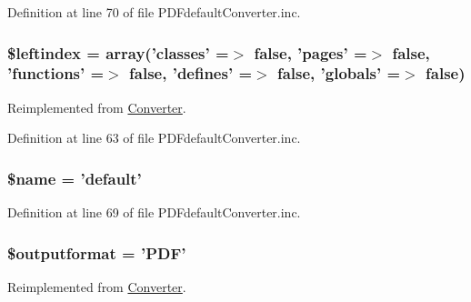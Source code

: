 \-Definition at line 70 of file \-P\-D\-Fdefault\-Converter.\-inc.

\hypertarget{class_p_d_fdefault_converter_ab49669c749559bb7833762878adb8f0c}{
\subsubsection[{\$leftindex}]{\setlength{\rightskip}{0pt plus 5cm}\$leftindex = array('classes' =$>$ false, 'pages' =$>$ false, 'functions' =$>$ false, 'defines' =$>$ false, 'globals' =$>$ false)}}\label{class_p_d_fdefault_converter_ab49669c749559bb7833762878adb8f0c}


\-Reimplemented from \hyperlink{class_converter_ab49669c749559bb7833762878adb8f0c}{\-Converter}.



\-Definition at line 63 of file \-P\-D\-Fdefault\-Converter.\-inc.

\hypertarget{class_p_d_fdefault_converter_ab2fc40d43824ea3e1ce5d86dee0d763b}{
\subsubsection[{\$name}]{\setlength{\rightskip}{0pt plus 5cm}\$name = 'default'}}\label{class_p_d_fdefault_converter_ab2fc40d43824ea3e1ce5d86dee0d763b}


\-Definition at line 69 of file \-P\-D\-Fdefault\-Converter.\-inc.

\hypertarget{class_p_d_fdefault_converter_af0bfe153c049d957e8ea29b147025108}{
\subsubsection[{\$outputformat}]{\setlength{\rightskip}{0pt plus 5cm}\$outputformat = '\-P\-D\-F'}}\label{class_p_d_fdefault_converter_af0bfe153c049d957e8ea29b147025108}


\-Reimplemented from \hyperlink{class_converter_af0bfe153c049d957e8ea29b147025108}{\-Converter}.



